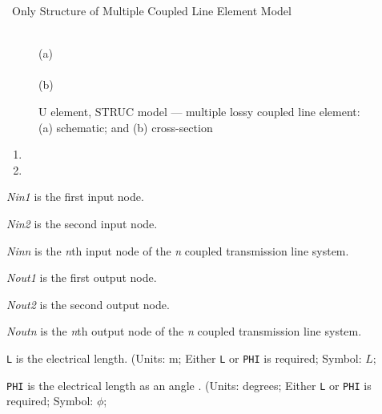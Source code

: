 %
%
{\sspice\ Only}
{Structure of Multiple Coupled Line Element Model}

\begin{figure}[h]
\centering
\ \epsfxsize=2in\\
(a)\\
\ \epsfxsize=5.5in\\
(b)\\
\vspace*{2in}
\caption{U element, STRUC model --- multiple lossy coupled line element:
(a) schematic; and (b) cross-section}
\end{figure}

\begin{enumerate}
\item
{}
\item
{}
\end{enumerate}


\begin{widelist}
\item[{\it Nin1}] is the first input node.
\item[{\it Nin2}] is the second input node.
\item[{\it Ninn}] is the {\it n}th input node of the {\it n} coupled
                  transmission line system.
\item[{\it Nout1}] is the first output node.
\item[{\it Nout2}] is the second output node.
\item[{\it Noutn}] is the {\it n}th output node of the {\it n} coupled
                  transmission line system.
\item[{\tt L}]	 is the electrical length.
                 (Units: m; Either {\tt L} or {\tt PHI} is required;
                 Symbol: $L$;
\item[{\tt PHI}] is the electrical length as an angle .
                (Units: degrees; Either {\tt L} or {\tt PHI} is required;
                Symbol: $\phi$;
\end{widelist}

